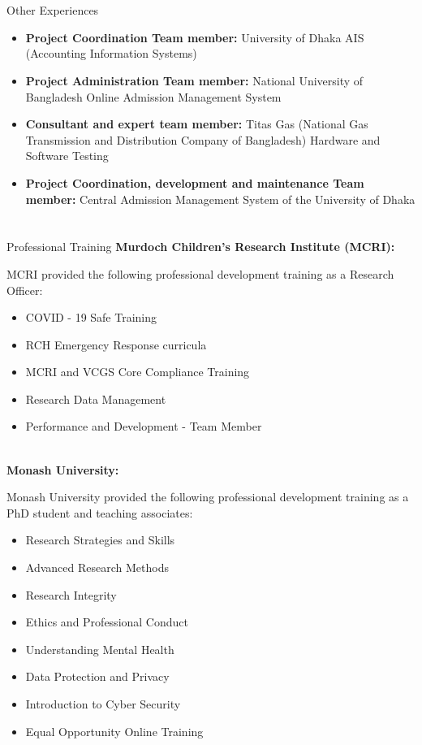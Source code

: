 \documentclass{my_cv}
\begin{document}
\section{\faBuilding}{Other Experiences}
\begin{itemize}[noitemsep]
    \item \textbf{Project Coordination Team member:} University of Dhaka AIS (Accounting Information Systems)
    \item \textbf{Project Administration Team member:} National University of Bangladesh Online Admission Management System
    \item \textbf{Consultant and expert team member:} Titas Gas (National Gas Transmission and Distribution Company of Bangladesh) Hardware and Software Testing
    \item \textbf{Project Coordination, development and maintenance Team member:} Central Admission Management System of the University of Dhaka
\end{itemize}

\section{\faSoccerBallO}{Professional Training}
{\bf Murdoch Children's Research Institute (MCRI):} 

MCRI provided the following professional development training as a Research Officer:

\begin{itemize}[noitemsep]
    \item COVID - 19 Safe Training
    \item RCH Emergency Response curricula
    \item MCRI and VCGS Core Compliance Training
    \item Research Data Management
    \item Performance and Development - Team Member
\end{itemize}

\noindent\\
{\bf Monash University:} 

Monash University provided the following professional development training as a PhD student and teaching associates:

\begin{itemize}[noitemsep]
    \item Research Strategies and Skills
    \item Advanced Research Methods
    \item Research Integrity
    \item Ethics and Professional Conduct
    \item Understanding Mental Health
    \item Data Protection and Privacy
    \item Introduction to Cyber Security
    \item Equal Opportunity Online Training
\end{itemize}
\end{document}

